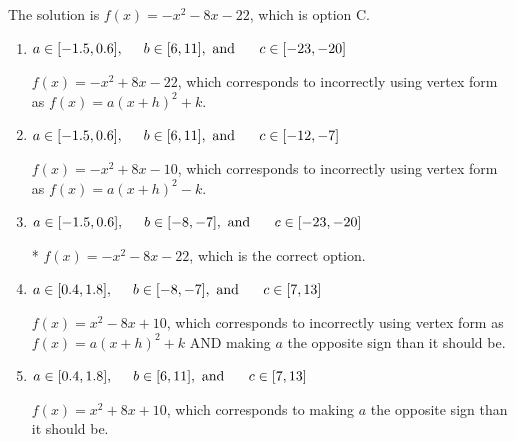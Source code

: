 \documentclass{extbook}[14pt]
\begin{document}
\begin{enumerate}
{The solution is \( f(x) = -x^{2} -8 x -22 \), which is option C.\begin{enumerate}[label=\Alph*.]
\item \( a \in [-1.5, 0.6], \hspace*{5mm} b \in [6, 11], \text{ and } \hspace*{5mm} c \in [-23, -20] \)

$f(x)=-x^{2} +8 x -22$, which corresponds to incorrectly using vertex form as $f(x) = a(x+h)^2+k$.
\item \( a \in [-1.5, 0.6], \hspace*{5mm} b \in [6, 11], \text{ and } \hspace*{5mm} c \in [-12, -7] \)

$f(x)=-x^{2} +8 x -10$, which corresponds to incorrectly using vertex form as $f(x) = a(x+h)^2 - k$.
\item \( a \in [-1.5, 0.6], \hspace*{5mm} b \in [-8, -7], \text{ and } \hspace*{5mm} c \in [-23, -20] \)

* $f(x)=-x^{2} -8 x -22$, which is the correct option.
\item \( a \in [0.4, 1.8], \hspace*{5mm} b \in [-8, -7], \text{ and } \hspace*{5mm} c \in [7, 13] \)

$f(x)=x^{2} -8 x + 10$, which corresponds to incorrectly using vertex form as $f(x) = a(x+h)^2+k$ AND making $a$ the opposite sign than it should be.
\item \( a \in [0.4, 1.8], \hspace*{5mm} b \in [6, 11], \text{ and } \hspace*{5mm} c \in [7, 13] \)

$f(x)=x^{2} +8 x + 10$, which corresponds to making $a$ the opposite sign than it should be.
\end{enumerate}

}
\end{enumerate}
\end{document}

